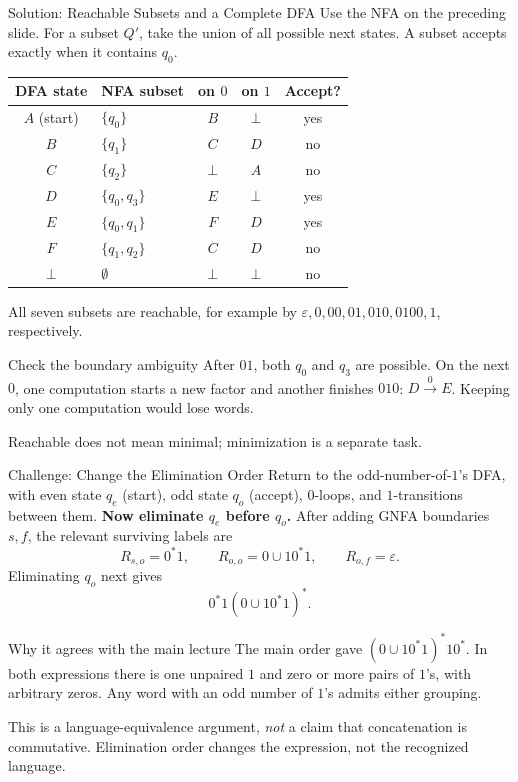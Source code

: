 \documentclass[10pt]{beamer}
\begin{document}
\begin{frame}{Solution: Reachable Subsets and a Complete DFA}
  \small
  Use the NFA on the preceding slide. For a subset $Q'$, take the union of
  all possible next states. A subset accepts exactly when it contains $q_0$.
  \pause
  \begin{center}
    \begin{tabular}{c|l|cc|c}
      DFA state & NFA subset & on $0$ & on $1$ & Accept? \\
      \hline
      $A$ (start) & $\{q_0\}$     & $B$ & $\bot$ & yes \\
      $B$ & $\{q_1\}$           & $C$ & $D$ & no \\
      $C$ & $\{q_2\}$           & $\bot$ & $A$ & no \\
      $D$ & $\{q_0,q_3\}$       & $E$ & $\bot$ & yes \\
      $E$ & $\{q_0,q_1\}$       & $F$ & $D$ & yes \\
      $F$ & $\{q_1,q_2\}$       & $C$ & $D$ & no \\
      $\bot$ & $\emptyset$      & $\bot$ & $\bot$ & no
    \end{tabular}
  \end{center}
  \pause
  All seven subsets are reachable, for example by
  $\varepsilon,0,00,01,010,0100,1$, respectively.
  \begin{exampleblock}{Check the boundary ambiguity}
    After $01$, both $q_0$ and $q_3$ are possible. On the next $0$, one
    computation starts a new factor and another finishes $010$:
    $D\xrightarrow{0}E$. Keeping only one computation would lose words.
  \end{exampleblock}
  Reachable does not mean minimal; minimization is a separate task.
\end{frame}

\begin{frame}{Challenge: Change the Elimination Order}
  \small
  Return to the odd-number-of-$1$'s DFA, with even state $q_e$ (start),
  odd state $q_o$ (accept), $0$-loops, and $1$-transitions between them.
  \textbf{Now eliminate $q_e$ before $q_o$.}
  \pause
  After adding GNFA boundaries $s,f$, the relevant surviving labels are
  \[
    R_{s,o}=0^*1,\qquad R_{o,o}=0\cup10^*1,\qquad
    R_{o,f}=\varepsilon.
  \]
  Eliminating $q_o$ next gives
  \[
    0^*1(0\cup10^*1)^*.
  \]
  \pause
  \begin{block}{Why it agrees with the main lecture}
    The main order gave $(0\cup10^*1)^*10^*$. In both expressions there
    is one unpaired $1$ and zero or more pairs of $1$'s, with arbitrary
    zeros. Any word with an odd number of $1$'s admits either grouping.
  \end{block}
  This is a language-equivalence argument, \emph{not} a claim that
  concatenation is commutative. Elimination order changes the expression,
  not the recognized language.
\end{frame}
\end{document}
